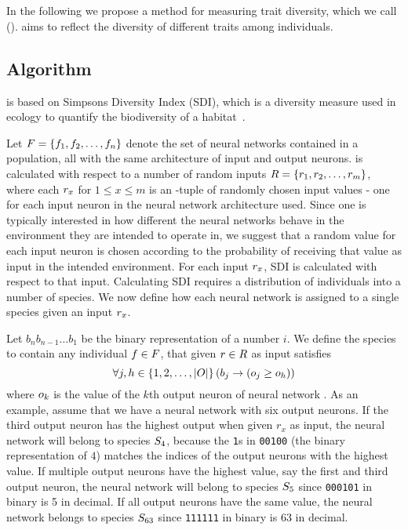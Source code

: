 \section{\di{}}\label{sec:nntd}
In the following we propose a method for measuring trait diversity, which we call \emph{\di{}} (\dia). \dia{} aims to reflect the diversity of different traits among individuals. 

\subsection{Algorithm}
\dia{} is based on Simpsons Diversity Index (SDI), which is a diversity measure used in ecology to quantify the biodiversity of a habitat~\cite{simpson1949measurement}.

Let $F = \left\{ f_1, f_2, \dots, f_n \right\}$ denote the set of neural networks contained in a population, all with the same architecture of \nninsetl{} input and \nnoutsetl{} output neurons. \dia{} is calculated with respect to a number of random inputs $R = \left\{ r_1, r_2, \dots, r_m \right\}$, where each $r_x$ for $1 \leq x \leq m$ is an \nninsetl-tuple of randomly chosen input values - one for each input neuron in the neural network architecture used.
Since one is typically interested in how different the neural networks behave in the environment they are intended to operate in, we suggest that a random value for each input neuron is chosen according to the probability of receiving that value as input in the intended environment. For each input $r_x$, SDI is calculated with respect to that input. Calculating SDI requires a distribution of individuals into a number of species. We now define how each neural network is assigned to a single species given an input $r_x$. 

Let $b_{n}b_{n-1}\dots b_1$ be the binary representation of a number $i$.
We define the species  to contain any individual $f \in F$, that given $r \in R$ as input satisfies
%
\begin{equation}\label{eq:nntdbucket}
  \forall j, h \in \left\{ 1, 2, \dots, \lvert O\rvert \right\} \left(b_j \rightarrow \left(o_j \geq o_h\right)\right)
\end{equation}
%
where $o_k$ is the value of the $k$th output neuron of neural network \ind.
As an example, assume that we have a neural network with six output neurons. If the third output neuron has the highest output when given $r_x$ as input, the neural network will belong to species $S_4$, because the \texttt{1}s in \texttt{00100} (the binary representation of $4$) matches the indices of the output neurons with the highest value. If multiple output neurons have the highest value, say the first and third output neuron, the neural network will belong to species $S_5$ since \texttt{000101} in binary is 5 in decimal. If all output neurons have the same value, the neural network belongs to species $S_{63}$ since \texttt{111111} in binary is 63 in decimal.


